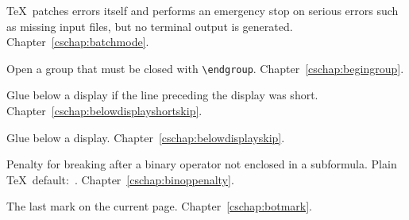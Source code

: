 \begin{glossinventory}
\item [\cs{batchmode}]
      \TeX\ patches errors itself 
 \alt
      and performs an emergency stop on serious errors 
      such as missing input files,
      but no terminal output is generated.
Chapter~\ref{cschap:batchmode}.

\item [\cs{begingroup}]
      Open a group that must be closed with \verb-\endgroup-.
Chapter~\ref{cschap:begingroup}.

\item [\cs{belowdisplayshortskip}]
      Glue below a display if the line preceding the display was short.
Chapter~\ref{cschap:belowdisplayshortskip}.

\item [\cs{belowdisplayskip}]
      Glue below a display.
Chapter~\ref{cschap:belowdisplayskip}.

\item [\cs{binoppenalty}]
      Penalty for breaking after a binary operator not enclosed in
      a subformula.
      Plain \TeX\ default:~.
Chapter~\ref{cschap:binoppenalty}.

\item [\cs{botmark}]
      The last mark on the current page.
Chapter~\ref{cschap:botmark}.


\end{glossinventory}
